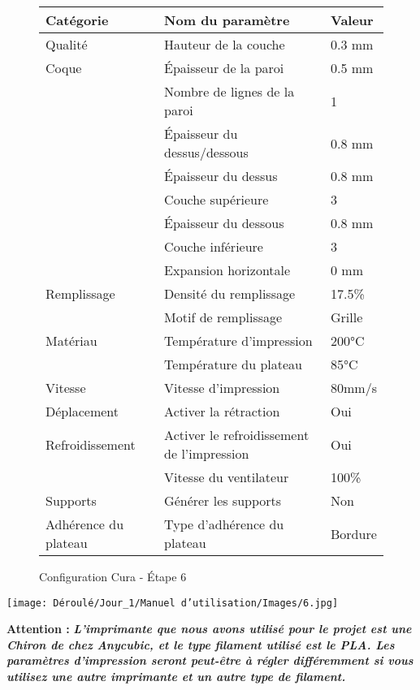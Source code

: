 \begin{flushleft}
\begin{figure}[!h]
\begin{tabular}{|l|l|l|}
    \hline Catégorie & Nom du paramètre & Valeur\\
    \hline Qualité & Hauteur de la couche & 0.3 mm\\
    \hline Coque & \'Epaisseur de la paroi & 0.5 mm\\
    \hline & Nombre de lignes de la paroi & 1\\
    \hline & \'Epaisseur du dessus/dessous & 0.8 mm\\
    \hline & \'Epaisseur du dessus & 0.8 mm\\
    \hline & Couche supérieure & 3\\
    \hline & \'Epaisseur du dessous & 0.8 mm\\
    \hline & Couche inférieure & 3\\
    \hline & Expansion horizontale & 0 mm\\
    \hline Remplissage & Densité du remplissage & 17.5\% \\
    \hline & Motif de remplissage & Grille\\
    \hline Matériau & Température d'impression & 200°C\\
    \hline & Température du plateau & 85°C\\
    \hline Vitesse & Vitesse d'impression & 80mm/s\\
    \hline Déplacement & Activer la rétraction & Oui\\
    \hline Refroidissement & Activer le refroidissement de l'impression & Oui\\
    \hline & Vitesse du ventilateur & 100\% \\
    \hline Supports & Générer les supports & Non \\
    \hline Adhérence du plateau & Type d'adhérence du plateau & Bordure \\
    \hline 
    
    \end{tabular}
    \caption[\'Etape 6]{Configuration Cura - \'Etape 6}
    \label{fig:my_label}
\end{figure}

\begin{multicols}{2}
    \texttt{[image: Déroulé/Jour\_1/Manuel d'utilisation/Images/6.jpg]}
    
    \columnbreak
    
\textbf{\large Attention : }\textbf{\textit{L'imprimante que nous avons utilisé pour le projet est une Chiron de chez Anycubic, et le type filament utilisé est le PLA. Les paramètres d'impression seront peut-être à régler différemment si vous utilisez une autre imprimante et un autre type de filament.}}\\\vspace{0.2cm}
\end{multicols}


\end{flushleft}
